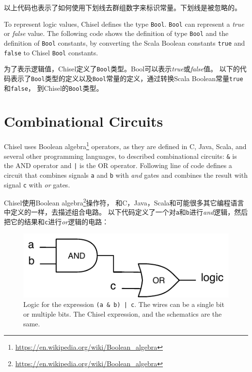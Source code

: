 \documentclass[%
    10pt,
    headinclude, footexclude,
    openright, %
    notitlepage,
    cleardoubleempty,
    headsepline,
    pointlessnumbers,
    bibtotoc, idxtotoc,
    ]{scrbook}
\newcommand{\code}[1]{{\small{\texttt{#1}}}}
\newcommand{\scale}{0.7}
\newcommand{\myref}[2]{\href{#1}{#2}}
\renewcommand{\myref}[2]{{#2}{\footnote{\url{#1}}}}
\begin{document}
以上代码也表示了如何使用下划线去群组数字来标识常量。下划线是被忽略的。

To represent logic values, Chisel defines the type \code{Bool}.
\code{Bool} can represent a \emph{true} or \emph{false} value.
The following code shows the definition of type \code{Bool} and the definition of
\code{Bool} constants, by converting the Scala Boolean constants \code{true}
and \code{false} to Chisel \code{Bool} constants.

为了表示逻辑值，Chisel定义了\code{Bool}类型。Bool可以表示\emph{true}或\emph{false}值。
以下的代码表示了\code{Bool}类型的定义以及\code{Bool}常量的定义，通过转换Scala Boolean常量\code{true}和\code{false}， 到Chisel的\code{Bool}类型。




\section{Combinational Circuits}

Chisel uses \myref{https://en.wikipedia.org/wiki/Boolean_algebra}{Boolean algebra} operators,
as they are defined in C, Java, Scala, and several other programming languages,
to described combinational circuits: \code{\&} is the AND operator and \code{|} is
the OR operator.
Following line of code defines a circuit that combines signals \code{a} and \code{b} with \emph{and}
gates and combines the result with signal \code{c} with \emph{or} gates.

Chisel使用\myref{https://en.wikipedia.org/wiki/Boolean_algebra}{Boolean algebra}操作符，
和C，Java，Scala和可能很多其它编程语言中定义的一样，去描述组合电路。
以下代码定义了一个对\code{a}和\code{b}进行\emph{and}逻辑，然后把它的结果和\code{c}进行\emph{or}逻辑的电路：



\begin{figure}
  \centering
  \includegraphics[scale=\scale]{figures/logic}
  \caption{Logic for the expression \code{(a \& b) | c}.
  The wires can be a single bit or multiple bits. The Chisel expression, and the schematics are the same.}
  \label{fig:logic}
\end{figure}
\end{document}
